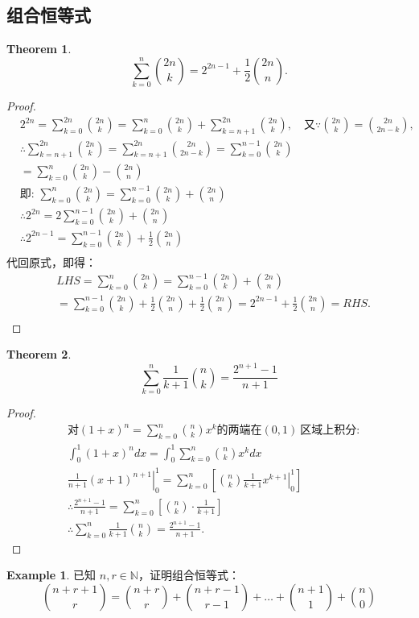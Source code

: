 \documentclass[oneside]{book}
\theoremstyle{definition}
\newtheorem{example}{Example}[section]
\newtheorem{theorem}{Theorem}[section]
\begin{document}
\subsection{组合恒等式}
\begin{theorem}
	$$\sum_{k=0}^{n} \binom{2n}{k} = 2^{2n - 1} + \frac{1}{2}\binom{2n}{n}.$$
\end{theorem}
\begin{proof}
	\[
	\begin{aligned}
		&2^{2n} = \sum_{k=0}^{2n} \binom{2n}{k} = \sum_{k=0}^{n} \binom{2n}{k} + \sum_{k=n+1}^{2n} \binom{2n}{k}, \quad \text{又} \because \binom{2n}{k} = \binom{2n}{2n - k}, \\
		&\therefore \sum_{k=n+1}^{2n} \binom{2n}{k} = \sum_{k=n+1}^{2n} \binom{2n}{2n-k} =  \sum_{k=0}^{n - 1} \binom{2n}{k} \\
		&= \sum_{k=0}^{n} \binom{2n}{k} - \binom{2n}{n}\\
		&\text{即: } \sum_{k=0}^{n} \binom{2n}{k} = \sum_{k=0}^{n - 1} \binom{2n}{k} + \binom{2n}{n} \\
		&\therefore 2^{2n} = 2\sum_{k=0}^{n - 1} \binom{2n}{k} + \binom{2n}{n} \\
		&\therefore 2^{2n - 1} = \sum_{k=0}^{n - 1} \binom{2n}{k} + \frac{1}{2}\binom{2n}{n} \\
	\end{aligned}
	\]
	代回原式，即得：
	\[
	\begin{aligned}
		&LHS=\sum_{k=0}^{n}\binom{2n}{k}=\sum_{k=0}^{n - 1} \binom{2n}{k} + \binom{2n}{n} \\
		&=\sum_{k=0}^{n - 1} \binom{2n}{k} + \frac{1}{2}\binom{2n}{n}+\frac{1}{2}\binom{2n}{n}=2^{2n - 1} + \frac{1}{2}\binom{2n}{n}=RHS.\\
	\end{aligned}
	\]
\end{proof}
\begin{theorem}
	$$\sum_{k=0}^{n} \frac{1}{k+1} \binom{n}{k} = \frac{2^{n+1} - 1}{n+1}$$
\end{theorem}
\begin{proof}
	\[
	\begin{aligned}
		&\text{对} 	(1+x)^n = \sum_{k=0}^{n} \binom{n}{k} x^k\text{的两端在}(0,1) \ \text{区域上积分:} \\
		&\int_{0}^{1} (1+x)^n dx = \int_{0}^{1} \sum_{k=0}^{n} \binom{n}{k} x^k dx \\
		&\left. \frac{1}{n+1} (x+1)^{n+1} \right|_{0}^{1} = \sum_{k=0}^{n}\left[ \left. \binom{n}{k} \frac{1}{k+1} x^{k+1} \right|_{0}^{1} \right]\\
		&\therefore \frac{2^{n+1} - 1}{n+1} = \sum_{k=0}^{n} \left[ \binom{n}{k} \cdot \frac{1}{k+1} \right] \\
		&\therefore \sum_{k=0}^{n} \frac{1}{k+1} \binom{n}{k} = \frac{2^{n+1} - 1}{n+1}.
	\end{aligned}
	\]
\end{proof}
\begin{example}
	已知 \( n, r \in \mathbb{N} \)，证明组合恒等式：
	\[
	\binom{n+r+1}{r} = \binom{n+r}{r} + \binom{n+r-1}{r-1} + \dots + \binom{n+1}{1} + \binom{n}{0}
	\]
\end{example}
\end{document}
